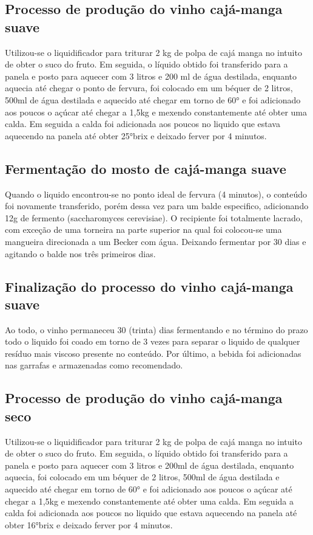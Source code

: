\documentclass[article,12pt,onesidea,4paper,english,brazil]{abntex2}
\begin{document}
\subsection*{Processo de produção do vinho cajá-manga suave}

	Utilizou-se o liquidificador para triturar 2 kg de polpa de cajá manga no intuito de obter o suco do fruto. Em seguida, o líquido obtido foi transferido para a panela e posto para aquecer com 3 litros e 200 ml de água destilada, enquanto aquecia até chegar o ponto de fervura, foi colocado em um béquer de 2 litros, 500ml de água destilada e aquecido até chegar em torno de 60° e foi adicionado aos poucos o açúcar até chegar a 1,5kg e mexendo constantemente até obter uma calda. Em seguida a calda foi adicionada aos poucos no liquido que estava aquecendo na panela até obter 25°brix e deixado ferver por 4 minutos.
	
\subsection*{Fermentação do mosto de cajá-manga suave}
	
	Quando o liquido encontrou-se no ponto ideal de fervura (4 minutos), o conteúdo foi novamente transferido, porém dessa vez para um balde especifico, adicionando 12g de fermento (saccharomyces cerevisiae). O recipiente foi totalmente lacrado, com exceção de uma torneira na parte superior na qual foi colocou-se uma mangueira direcionada a um Becker com água. Deixando fermentar por 30 dias e agitando o balde nos três primeiros dias.
	
	\subsection*{Finalização do processo do vinho cajá-manga suave}
	
	Ao todo, o vinho permaneceu 30 (trinta) dias fermentando e no término do prazo todo o liquido foi coado em torno de 3 vezes para separar o liquido de qualquer resíduo mais viscoso presente no conteúdo. Por último, a bebida foi adicionadas nas garrafas e armazenadas como recomendado.
	
	\subsection*{Processo de produção do vinho cajá-manga seco}
	
	Utilizou-se o liquidificador para triturar 2 kg de polpa de cajá manga no intuito de obter o suco do fruto. Em seguida, o líquido obtido foi transferido para a panela e posto para aquecer com 3 litros e 200ml de água destilada, enquanto aquecia, foi colocado em um béquer de 2 litros, 500ml de água destilada e aquecido até chegar em torno de 60° e foi adicionado aos poucos o açúcar até chegar a 1,5kg e mexendo constantemente até obter uma calda. Em seguida a calda foi adicionada aos poucos no liquido que estava aquecendo na panela até obter 16°brix e deixado ferver por 4 minutos.
	
\end{document}
